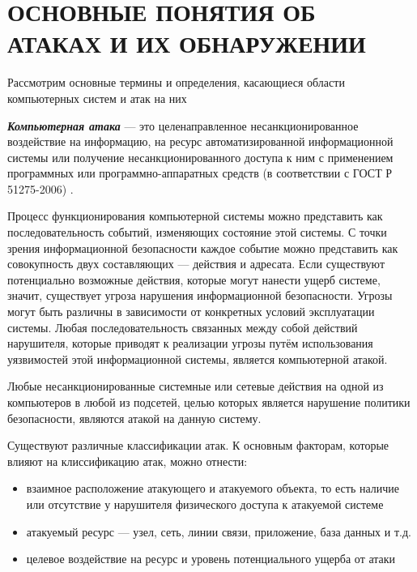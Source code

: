\section{ОСНОВНЫЕ ПОНЯТИЯ ОБ АТАКАХ И ИХ ОБНАРУЖЕНИИ}

Рассмотрим основные термины и определения, касающиеся области компьютерных систем и атак на них

\textit{\textbf{Компьютерная атака}} --- это целенаправленное несанкционированное воздействие на информацию, на ресурс автоматизированной информационной системы или получение несанкционированного доступа к ним с применением программных или программно-аппаратных средств (в соответствии с ГОСТ Р 51275-2006) \cite{bib:gostAttack}.

Процесс функционирования компьютерной системы можно представить как последовательность событий, изменяющих состояние этой системы. С точки зрения информационной безопасности каждое событие можно представить как совокупность двух составляющих --- действия и адресата. Если существуют потенциально возможные действия, которые могут нанести ущерб системе, значит, существует угроза нарушения информационной безопасности. Угрозы могут быть различны в зависимости от конкретных условий эксплуатации системы. Любая последовательность связанных между собой действий нарушителя, которые приводят к реализации угрозы путём использования уязвимостей этой информационной системы, является компьютерной атакой.

Любые несанкционированные системные или сетевые действия на одной из компьютеров в любой из подсетей, целью которых является нарушение политики безопасности, являются атакой на данную систему.

Существуют различные классификации атак. К основным факторам, которые влияют на клиссификацию атак, можно отнести:

\begin{itemize}

\item взаимное расположение атакующего и атакуемого объекта, то есть наличие или отсутствие у нарушителя физического доступа к атакуемой системе

\item атакуемый ресурс --- узел, сеть, линии связи, приложение, база данных и т.д.

\item целевое воздействие на ресурс и уровень потенциального ущерба от атаки

\end{itemize}

